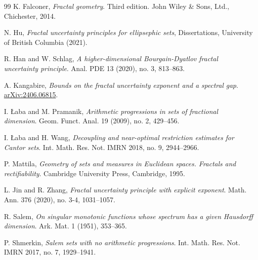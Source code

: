\documentclass[12pt,reqno]{amsart}
\theoremstyle{plain}
\theoremstyle{remark}
\numberwithin{equation}{section}
\begin{document}
\begin{thebibliography}{99}
 K. Falconer, 
\textit{Fractal geometry}. Third edition. John Wiley \& Sons, Ltd., Chichester, 2014.

 N. Hu, 
\textit{Fractal uncertainty principles for ellipsephic sets}, Dissertations, University of British Columbia (2021).

 R. Han and W. Schlag, 
\textit{A higher-dimensional Bourgain-Dyatlov fractal uncertainty principle}. Anal. PDE 13 (2020), no. 3, 813--863.

 A. Kangabire,
\textit{Bounds on the fractal uncertainty exponent and a spectral gap}. \href{https://arxiv.org/abs/2406.06815}{	arXiv:2406.06815}.

 I. \L{}aba and M. Pramanik, 
\textit{Arithmetic progressions in sets of fractional dimension}. Geom. Funct. Anal. 19 (2009), no. 2, 429--456.

 I. \L{}aba and H. Wang, 
\textit{Decoupling and near-optimal restriction estimates for Cantor sets}. Int. Math. Res. Not. IMRN 2018, no. 9, 2944--2966.

 P. Mattila, 
\textit{Geometry of sets and measures in Euclidean spaces. Fractals and rectifiability}. Cambridge University Press, Cambridge, 1995.

 L. Jin and R. Zhang, 
\textit{Fractal uncertainty principle with explicit exponent}. Math. Ann. 376 (2020), no. 3-4, 1031--1057.

 R. Salem, 
\textit{On singular monotonic functions whose spectrum has a given Hausdorff dimension}. Ark. Mat. 1 (1951), 353--365.

 P. Shmerkin,
\textit{Salem sets with no arithmetic progressions}. Int. Math. Res. Not. IMRN 2017, no. 7, 1929--1941.

\end{thebibliography}
\end{document}
